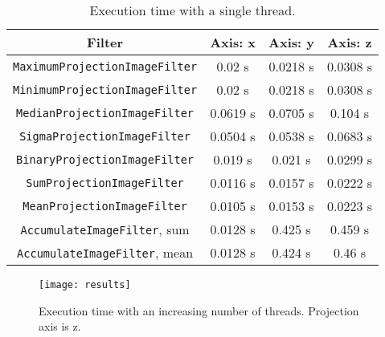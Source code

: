 \documentclass{InsightArticle}
\begin{document}
\begin{table}[htbp]
\centering
\begin{tabular}{cccc}
\hline
Filter & Axis: x & Axis: y & Axis: z \\
\hline
\hline
\verb$MaximumProjectionImageFilter$  & 0.02 s   & 0.0218 s & 0.0308 s \\
\verb$MinimumProjectionImageFilter$  & 0.02 s   & 0.0218 s & 0.0308 s\\
\verb$MedianProjectionImageFilter$   & 0.0619 s & 0.0705 s & 0.104 s \\
\verb$SigmaProjectionImageFilter$    & 0.0504 s & 0.0538 s & 0.0683 s\\
\verb$BinaryProjectionImageFilter$   & 0.019  s & 0.021 s  & 0.0299 s\\
\verb$SumProjectionImageFilter$      & 0.0116 s & 0.0157 s & 0.0222 s\\
\verb$MeanProjectionImageFilter$     & 0.0105 s & 0.0153 s & 0.0223 s\\
\hline
\verb$AccumulateImageFilter$, sum    & 0.0128 s & 0.425 s  & 0.459 s \\
\verb$AccumulateImageFilter$, mean   & 0.0128 s & 0.424 s  & 0.46 s  \\
\hline
\end{tabular}
\caption{Execution time with a single thread.\label{perf}}
\end{table}

\begin{figure}[htbp]
\centering
\texttt{[image: results]}
\caption{Execution time with an increasing number of threads. Projection axis is z.\label{results}}
\end{figure}
\end{document}
